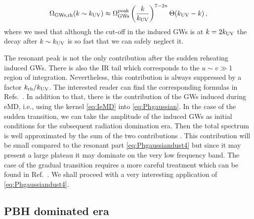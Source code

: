 \documentclass[a4paper,11pt]{article}
\numberwithin{equation}{section}
\begin{document}
\begin{align}\label{eq:Phgaussiandust4}
\Omega_{\rm GWs,rh}(k\sim k_{\rm UV})\approx\Omega^{\rm peak}_{\rm GWs}\left(\frac{k}{k_{\rm UV}}\right)^{7-2n}\Theta(k_{\rm UV}-k)\,,
\end{align}
where we used that although the cut-off in the induced GWs is at $k=2k_{\rm UV}$ the decay after $k\sim k_{\rm UV}$ is so fast that we can safely neglect it.

The resonant peak is not the only contribution after the sudden reheating induced GWs. There is also the IR tail which corresponds to the $u\sim v\gg 1$ region of integration. Nevertheless, this contribution is always suppressed by a factor $k_{\rm rh}/k_{\rm UV}$. The interested reader can find the corresponding formulas in Refs.~\cite{Inomata:2019ivs,Inomata:2020lmk}. In addition to that, there is the contribution of the GWs induced during eMD, i.e., using the kernel \eqref{eq:IeMD} into \eqref{eq:Phgaussian}. In the case of the sudden transition, we can take the amplitude of the induced GWs as initial conditions for the subsequent radiation domination era. Then the total spectrum is well approximated by the sum of the two contributions \cite{Inomata:2019ivs}. This contribution will be small compared to the resonant part \eqref{eq:Phgaussiandust4} but since it may present a large plateau \cite{Assadullahi:2009nf,Inomata:2019ivs,Papanikolaou:2020qtd} it may dominate on the very low frequency band. The case of the gradual transition requires a more careful treatment which can be found in Ref.~\cite{Inomata:2019zqy}. We shall proceed with a very interesting application of \eqref{eq:Phgaussiandust4}.


\subsection{PBH dominated era \label{sec:PBHdom}}
\end{document}

